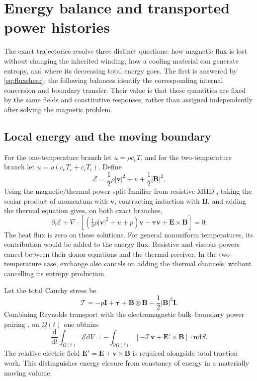 \documentclass[11pt,a4paper]{article}
\theoremstyle{remark}\newtheorem{remark}{Remark}
\numberwithin{equation}{section}
\newcommand{\dd}{\mathrm{d}}
\newcommand{\vv}{\boldsymbol v}
\newcommand{\BB}{\boldsymbol B}
\newcommand{\EE}{\boldsymbol E}
\newcommand{\nn}{\boldsymbol n}
\newcommand{\ttau}{\boldsymbol\tau}
\newcommand{\Id}{\boldsymbol I}
\newcommand{\diver}{\nabla\!\cdot}
\begin{document}

\section{Energy balance and transported power histories}\label{sec:energy}
The exact trajectories resolve three distinct questions: how magnetic flux is lost without changing the inherited winding, how a cooling material can generate entropy, and where its decreasing total energy goes. The first is answered by \eqref{eq:fluxshear}; the following balances identify the corresponding internal conversion and boundary transfer. Their value is that these quantities are fixed by the same fields and constitutive responses, rather than assigned independently after solving the magnetic problem.
\subsection{Local energy and the moving boundary}
For the one-temperature branch let $u=\rho c_vT$, and for the two-temperature branch let $u=\rho(c_eT_e+c_iT_i)$. Define
\begin{equation}
\mathcal E=\frac12\rho|\vv|^2+u+\frac12|\BB|^2.
\label{eq:energydef}
\end{equation}
Using the magnetic/thermal power split familiar from resistive MHD \citep{Carlier,Gawlik2025}, taking the scalar product of momentum with $\vv$, contracting induction with $\BB$, and adding the thermal equation gives, on both exact branches,
\begin{equation}
\partial_t\mathcal E+
\diver\left[(\tfrac12\rho|\vv|^2+u+p)\vv
-\ttau\vv+\EE\times\BB\right]=0.
\label{eq:localenergy}
\end{equation}
The heat flux is zero on these solutions. For general nonuniform temperatures, its contribution would be added to the energy flux. Resistive and viscous powers cancel between their donor equations and the thermal receiver. In the two-temperature case, exchange also cancels on adding the thermal channels, without cancelling its entropy production.

Let the total Cauchy stress be
\begin{equation}
\boldsymbol{\mathcal T}=-p\Id+\ttau+\BB\otimes\BB-\frac12|\BB|^2\Id.
\label{eq:totalstress}
\end{equation}
Combining Reynolds transport with the electromagnetic bulk--boundary power pairing \citep{PortHamiltonian,RenMultiChannel}, on $\Omega(t)$ one obtains
\begin{equation}
\frac{\dd}{\dd t}\int_{\Omega(t)}\mathcal E\dd V
=-\int_{\partial\Omega(t)}
[-\boldsymbol{\mathcal T}\vv+\EE'\times\BB]\cdot\nn\dd S.
\label{eq:movingenergy}
\end{equation}
The relative electric field $\EE'=\EE+\vv\times\BB$ is required alongside total traction work. This distinguishes energy closure from constancy of energy in a materially moving volume.
\end{document}

